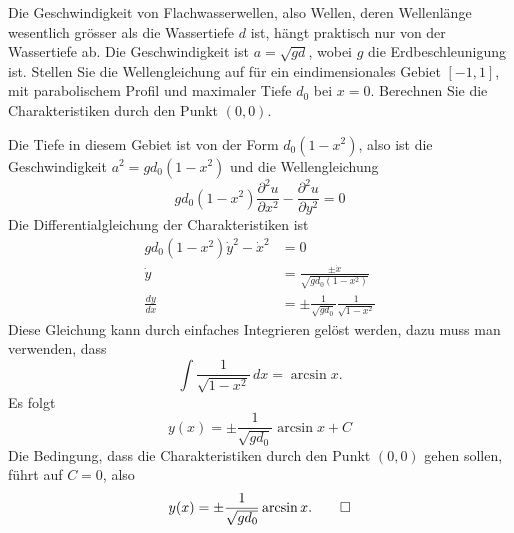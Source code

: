 Die Geschwindigkeit von Flachwasserwellen, also Wellen, deren Wellenlänge
wesentlich grösser als die Wassertiefe $d$ ist, hängt praktisch
nur von der Wassertiefe ab.  Die Geschwindigkeit ist $a=\sqrt{gd}$, wobei
$g$ die Erdbeschleunigung ist. Stellen Sie die Wellengleichung auf
für ein eindimensionales Gebiet $[-1,1]$, mit parabolischem Profil
und maximaler Tiefe $d_0$ bei $x=0$. Berechnen Sie die Charakteristiken
durch den Punkt $(0,0)$.

\begin{loesung}
Die Tiefe in diesem Gebiet ist von der Form $d_0(1-x^2)$, also ist
die Geschwindigkeit $a^2=gd_0(1-x^2)$ und die Wellengleichung
\[
gd_0(1-x^2)\frac{\partial^2 u}{\partial x^2}-\frac{\partial^2u}{\partial y^2}=0
\]
Die Differentialgleichung der Charakteristiken ist
\begin{align*}
gd_0(1-x^2)\dot y^2-\dot x^2&=0
\\
\dot y&=
\frac{\pm\dot x}{\sqrt{gd_0(1-x^2)}}
\\
\frac{dy}{dx}
&=
\pm\frac1{\sqrt{gd_0}}\frac1{\sqrt{1-x^2}}
\end{align*}
Diese Gleichung kann durch einfaches Integrieren gelöst werden,
dazu muss man verwenden, dass
\[
\int \frac1{\sqrt{1-x^2}}\,dx = \arcsin x.
\]
Es folgt
\[
y(x)
=
\pm\frac1{\sqrt{gd_0}}\arcsin x + C
\]
Die Bedingung, dass die Charakteristiken durch den Punkt $(0,0)$
gehen sollen, führt auf $C=0$, also
\[
y(x)=\pm\frac1{\sqrt{gd_0}}\arcsin x.
\qedhere
\]
\end{loesung}

